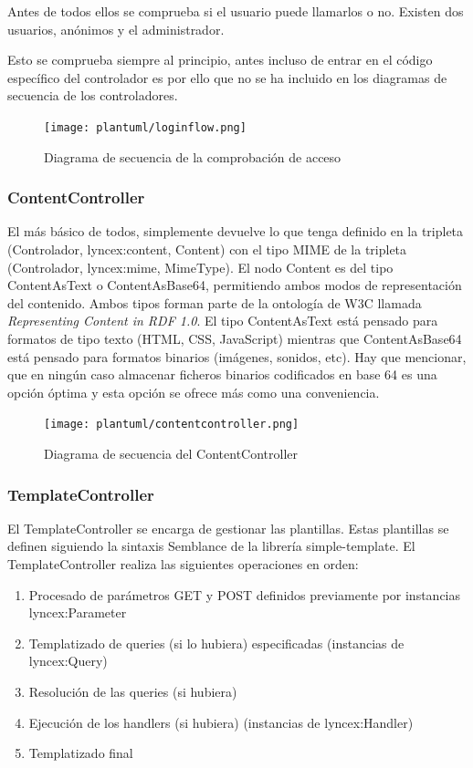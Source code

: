\documentclass[12pt]{report} %
\begin{document}
Antes de todos ellos se comprueba si el usuario puede llamarlos o no. Existen dos usuarios, anónimos y el administrador.

Esto se comprueba siempre al principio, antes incluso de entrar en el código específico del controlador es por ello que no se ha incluido en los diagramas de secuencia de los controladores.

\begin{figure}[h]
    \centering
    \texttt{[image: plantuml/loginflow.png]}
    \caption{Diagrama de secuencia de la comprobación de acceso}
    \label{fig:loginflow}
\end{figure}

\subsubsection{ContentController}
El más básico de todos, simplemente devuelve lo que tenga definido en la tripleta (Controlador, lyncex:content, Content) con el tipo MIME 
de la tripleta (Controlador, lyncex:mime, MimeType). El nodo Content es del tipo ContentAsText o ContentAsBase64, permitiendo ambos modos de representación del contenido.
Ambos tipos forman parte de la ontología de W3C llamada \textit{Representing Content in RDF 1.0}\cite{cnt}.
El tipo ContentAsText está pensado para formatos de tipo texto (HTML, CSS, JavaScript) mientras que ContentAsBase64 está pensado para formatos binarios (imágenes, sonidos, etc).
Hay que mencionar, que en ningún caso almacenar ficheros binarios codificados en base 64 es una opción óptima y esta opción se ofrece más como una conveniencia.

\begin{figure}[h]
    \centering
    \texttt{[image: plantuml/contentcontroller.png]}
    \caption{Diagrama de secuencia del ContentController}
    \label{fig:contentcontroller}
\end{figure}

\subsubsection{TemplateController}
El TemplateController se encarga de gestionar las plantillas. Estas plantillas se definen siguiendo la sintaxis Semblance de la librería simple-template.
El TemplateController realiza las siguientes operaciones en orden:
\begin{enumerate}
    \item Procesado de parámetros GET y POST definidos previamente por instancias lyncex:Parameter
    \item Templatizado de queries (si lo hubiera) especificadas (instancias de lyncex:Query)
    \item Resolución de las queries (si hubiera)
    \item Ejecución de los handlers (si hubiera) (instancias de lyncex:Handler)
    \item Templatizado final
\end{enumerate}
\end{document}
